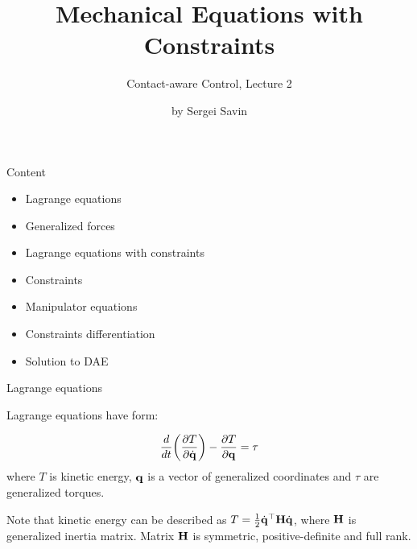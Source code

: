 \documentclass{beamer}
\title{Mechanical Equations with Constraints}
\subtitle{Contact-aware Control, Lecture 2}
\author{by Sergei Savin}
\date{\mydate}
\begin{document}
\maketitle


\begin{frame}{Content}

\begin{itemize}
\item Lagrange equations
\item Generalized forces
\item Lagrange equations with constraints
\item Constraints
\item Manipulator equations
\item Constraints differentiation
\item Solution to DAE
\end{itemize}

\end{frame}




\begin{frame}{Lagrange equations}
\begin{flushleft}

Lagrange equations have form:

\begin{equation}
	\frac{d}{dt} \bigg( 
	\frac{\partial T }{\partial \dot{\mathbf{q}}}
	\bigg) - 
	\frac{\partial T }{\partial \mathbf{q}} = \tau
\end{equation}
%
where $T$ is kinetic energy, $\mathbf{q}$ is a vector of generalized coordinates and $\tau$ are generalized torques.

\bigskip

Note that kinetic energy can be described as $T = \frac{1}{2} \dot{\mathbf{q}}^\top \mathbf{H} \dot{\mathbf{q}}$, where $\mathbf{H}$ is generalized inertia matrix. Matrix $\mathbf{H}$ is symmetric, positive-definite and full rank.

\end{flushleft}
\end{frame}
\end{document}
